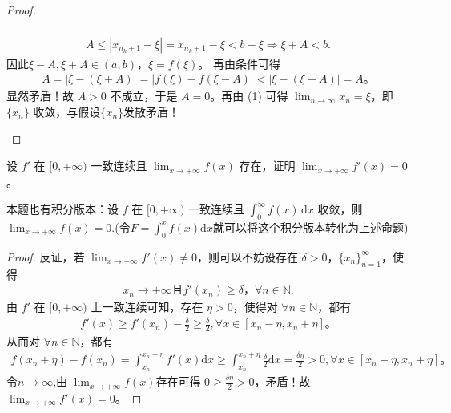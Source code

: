 \documentclass[../../main.tex]{subfiles}
\begin{document}
\begin{proof}
\begin{enumerate}[(1)]
\begin{enumerate}[(i)]
\begin{gather*}
\\
A\leqslant | x_{n_k+1}-\xi |=x_{n_k+1}-\xi <b-\xi \Longrightarrow \xi +A<b.
\end{gather*}
因此$\xi -A,\xi +A\in (a,b)$，$\xi =f(\xi)$。
再由条件可得
\begin{align*}
A = |\xi - (\xi + A)| = |f(\xi) - f(\xi - A)| < |\xi - (\xi - A)| = A。
\end{align*}
显然矛盾！故 $A > 0$ 不成立，于是 $A = 0$。再由 (1) 可得 $\lim_{n \to \infty} x_n = \xi$，即 $\{x_n\}$ 收敛，与假设$\{x_n\}$发散矛盾！
\end{enumerate}
\end{enumerate}

\end{proof}

\begin{proposition}\label{proposition:经典导数一致连续问题}
设 $f'$ 在 $[0,+\infty)$ 一致连续且 $\lim_{x \to +\infty} f(x)$ 存在，证明 $\lim_{x \to +\infty} f'(x) = 0$。
\end{proposition}
\begin{note}
本题也有积分版本：设 $f$ 在 $[0,+\infty)$ 一致连续且 $\int_{0}^{\infty} f(x) \, \mathrm{d}x$ 收敛，则 $\lim_{x \to +\infty} f(x) = 0$.(令$F=\int_0^x{f\left( x \right) \mathrm{d}x}$就可以将这个积分版本转化为上述命题)
\end{note}
\begin{proof}
反证，若 $\lim_{x\rightarrow +\infty} f'(x) \ne 0$，则可以不妨设存在 $\delta >0$，$\{ x_n \}_{n=1}^{\infty}$，使得
\begin{align*}
x_n\rightarrow +\infty \text{且} f'(x_n) \geqslant \delta，\forall n\in \mathbb{N}.    
\end{align*}
由 $f'$ 在 $[0,+\infty)$ 上一致连续可知，存在 $\eta >0$，使得对 $\forall n\in \mathbb{N}$，都有
\begin{align*}
f'(x) \geqslant f'(x_n) -\frac{\delta}{2} \geqslant \frac{\delta}{2}, \forall x\in [x_n-\eta ,x_n+\eta] 。
\end{align*}
从而对 $\forall n\in \mathbb{N}$，都有
\begin{align*}
f(x_n+\eta) -f(x_n) =\int_{x_n}^{x_n+\eta} f'(x) \mathrm{d}x \geqslant \int_{x_n}^{x_n+\eta} \frac{\delta}{2} \mathrm{d}x = \frac{\delta \eta}{2} > 0, \forall x\in [x_n-\eta ,x_n+\eta] 。
\end{align*}
令$n\rightarrow \infty$,由 $\lim_{x\rightarrow +\infty} f(x) $存在可得 $0 \geqslant \frac{\delta \eta}{2} > 0$，矛盾！故 $\lim_{x\rightarrow +\infty} f'(x) =0$。

\end{proof}
\end{document}
